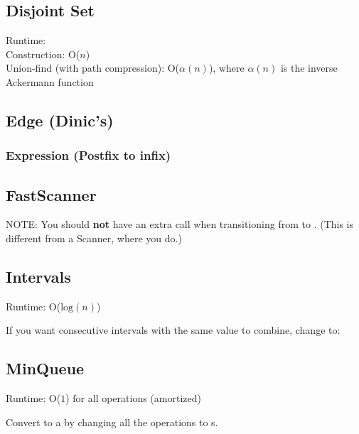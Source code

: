 \subsection*{Disjoint Set} 

Runtime: \\
\indent Construction: O($n$) \\
\indent Union-find (with path compression): O($\alpha (n)$), where $\alpha (n)$ is the inverse Ackermann function



\subsection*{Edge (Dinic's)}



\subsubsection*{Expression (Postfix to infix)}



\subsection*{FastScanner}

NOTE: You should \textbf{not} have an extra  call when transitioning from  to . (This is different from a Scanner, where you do.)



\subsection*{Intervals}

Runtime: O($\text{log}(n)$)



If you want consecutive intervals with the same value to combine, change  to:



\subsection*{MinQueue}

Runtime: O($1$) for all operations (amortized)

Convert to a  by changing all the  operations to s.




\newpage